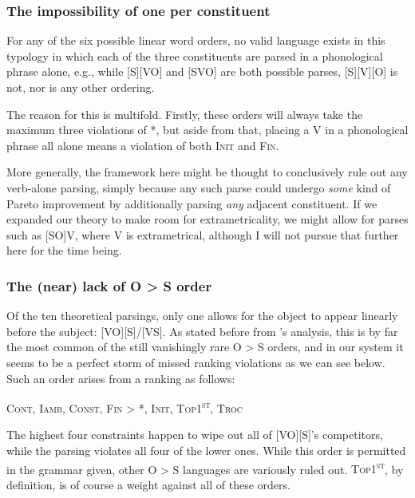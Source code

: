 \documentclass{article}
\newcommand{\cont}{\textsc{Cont}}
\newcommand{\iamb}{\textsc{Iamb}}
\newcommand{\cons}{\textsc{Const}}
\newcommand{\topf}{\textsc{Top1\textsuperscript{st}}}
\newcommand{\nophi}{\textsc{*\textphi}}
\newcommand{\finphi}{\textsc{Fin\textphi}}
\newcommand{\initphi}{\textsc{Init\textphi}}
\newcommand{\troc}{\textsc{Troc}}
\begin{document}
\subsubsection{The impossibility of one {\textphi} per constituent}

For any of the six possible linear word orders, no valid language exists in this typology in which each of the three constituents are parsed in a phonological phrase alone, e.g., while [S][VO] and [SVO] are both possible parses, [S][V][O] is not, nor is any other ordering.

The reason for this is multifold.
Firstly, these orders will always take the maximum three violations of {\nophi}, but aside from that, placing a V in a phonological phrase all alone means a violation of both {\initphi} and {\finphi}.

More generally, the framework here might be thought to conclusively rule out any verb-alone parsing, simply because any such parse could undergo \emph{some} kind of Pareto improvement by additionally parsing \emph{any} adjacent constituent.
If we expanded our theory to make room for extrametricality, we might allow for parses such as [SO]V, where V is extrametrical, although I will not pursue that further here for the time being.

\subsubsection{The (near) lack of O {\textgreater} S order}

Of the ten theoretical parsings, only one allows for the object to appear linearly before the subject: [VO][S]/[VS].
As stated before from \textcite{dryer13}'s analysis, this is by far the most common of the still vanishingly rare O {\textgreater} S orders, and in our system it seems to be a perfect storm of missed ranking violations as we can see below.
Such an order arises from a ranking as follows:

\begin{center}
\cont, \iamb, \cons, {\finphi} {\textgreater} \nophi, \initphi, \topf, \troc
\end{center}

The highest four constraints happen to wipe out all of [VO][S]'s competitors, while the parsing violates all four of the lower ones.
While this order is permitted in the grammar given, other O {\textgreater} S languages are variously ruled out.
{\topf}, by definition, is of course a weight against all of these orders.
\end{document}
